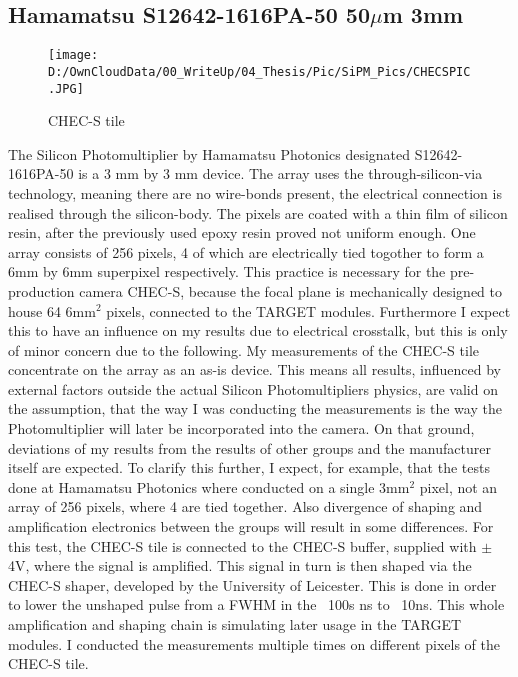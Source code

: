 \documentclass[12pt,article,type=msc,colorback,accentcolor=tud9c]{tudthesis}
\begin{document}
\clearpage
\subsection{Hamamatsu S12642-1616PA-50 50$\mu$m 3mm}
\begin{wrapfigure}{R}{0.3\textwidth}
\centering
\texttt{[image: D:/OwnCloudData/00\_WriteUp/04\_Thesis/Pic/SiPM\_Pics/CHECSPIC.JPG]}
\caption{\label{fig:CHECSTILE}CHEC-S tile}
\end{wrapfigure}
The Silicon Photomultiplier by Hamamatsu Photonics designated S12642-1616PA-50 is a 3 mm by 3 mm device. The array uses the through-silicon-via technology, meaning there are no wire-bonds present, the electrical connection is realised through the silicon-body. The pixels are coated with a thin film of silicon resin, after the previously used epoxy resin proved not uniform enough. One array consists of 256 pixels, 4 of which are electrically tied togother to form a 6mm by 6mm superpixel respectively. This practice is necessary for the pre-production camera CHEC-S, because the focal plane is mechanically designed to house 64 6mm$^{2}$ pixels, connected to the TARGET modules. Furthermore I expect this to have an influence on my results due to electrical crosstalk, but this is only of minor concern due to the following. My measurements of the CHEC-S tile concentrate on the array as an as-is device. This means all results, influenced by external factors outside the actual Silicon Photomultipliers physics, are valid on the assumption, that the way I was conducting the measurements is the way the Photomultiplier will later be incorporated into the camera. On that ground, deviations of my results from the results of other groups and the manufacturer itself are expected. To clarify this further, I expect, for example, that the tests done at Hamamatsu Photonics where conducted on a single 3mm$^2$ pixel, not an array of 256 pixels, where 4 are tied together. Also divergence of shaping and amplification electronics between the groups will result in some differences. For this test, the CHEC-S tile is connected to the CHEC-S buffer, supplied with $\pm$4V, where the signal is amplified. This signal in turn is then shaped via the CHEC-S shaper, developed by the University of Leicester. This is done in order to lower the unshaped pulse from a FWHM in the ~100s ns to ~10ns. This whole amplification and shaping chain is simulating later usage in the TARGET modules. I conducted the measurements multiple times on different pixels of the CHEC-S tile.
\end{document}
